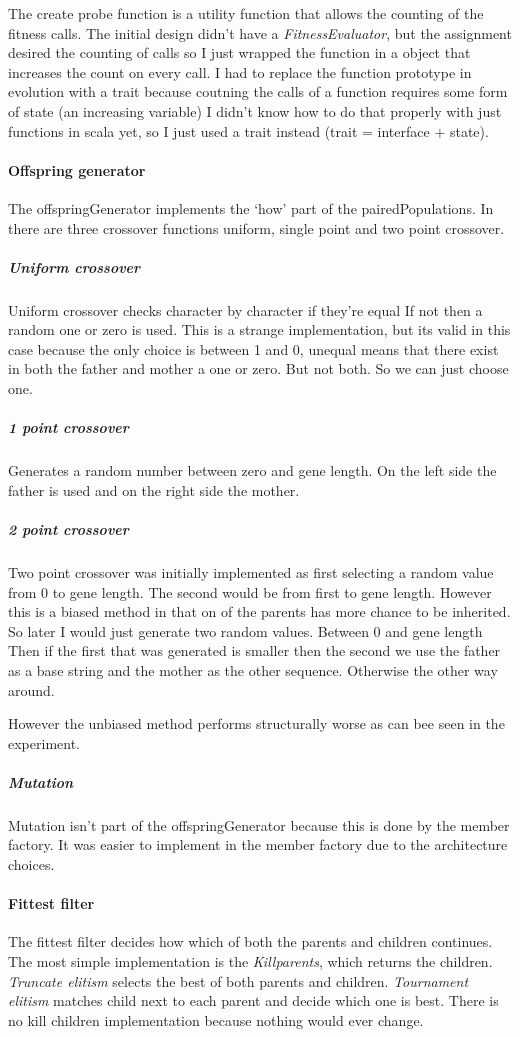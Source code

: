 \documentclass{article}
\begin{document}
\begin{empfile}
The create probe function is a utility function that allows the counting of
the fitness calls. The initial design didn't have a \emph{FitnessEvaluator},
but the assignment desired the counting of calls so I just wrapped the
function in a object that increases the count on every call. I had to
replace the function prototype in evolution with a trait because coutning
the calls of a function requires some form of state (an increasing variable)
I didn't know how to do that properly with just functions in scala yet,
so I just used a trait instead (trait = interface + state).

\paragraph{Offspring generator} The offspringGenerator implements the `how'
part of the pairedPopulations.  In there are three crossover functions
uniform, single point and two point crossover.

\subparagraph{Uniform crossover}
Uniform crossover checks character by character if they're equal
If not then a random one or zero is used. This is a strange
implementation, but its valid in this case because the only choice is
between 1 and 0, unequal means that there exist in both the father and
mother a one or zero. But not both. So we can just choose one.

\subparagraph{1 point crossover}
Generates a random number between zero and gene length. On the left side 
the father is used and on the right side the mother.

\subparagraph{2 point crossover}
Two point crossover was initially implemented
as first selecting a random value from 0 to gene length. The second would
be from first to gene length. However this is a biased method in that
on of the parents has more chance to be inherited. So
later I would just generate two random values. Between 0 and gene length
Then if the first that was generated is smaller then the second we use
the father as a base string and the mother as the other sequence. Otherwise
the other way around.

However the unbiased method performs structurally worse as can bee seen
in the experiment.

\subparagraph{Mutation}
Mutation isn't part of the offspringGenerator
because this is done by the member factory. It was easier to implement
in the member factory due to the architecture choices.

\label{paragraph:Fittest filter}
\paragraph{Fittest filter} The fittest filter decides how which of both
the parents and children continues.
The most simple implementation is the \emph{Killparents}, which
returns the children. \emph{Truncate elitism} selects the best of both parents
and children. \emph{Tournament elitism} matches child next to each parent
and decide which one is best. There is no kill children implementation
because nothing would ever change.


\end{empfile}
\end{document}
